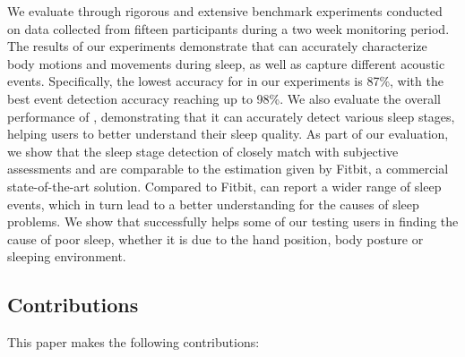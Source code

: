 
We evaluate \systemname through rigorous and extensive benchmark experiments conducted on data collected from fifteen participants during a
two week monitoring period. The results of our experiments demonstrate that \systemname can accurately characterize body motions and
movements during sleep, as well as capture different acoustic events. Specifically, the lowest accuracy for \systemname in our experiments
is 87\%, with the best event detection accuracy reaching up to 98\%. We also evaluate the overall performance of \systemname, demonstrating
that it can accurately detect various sleep stages, helping users to better understand their sleep quality. As part of our evaluation, we
show that the sleep stage detection of \systemname closely match with subjective assessments and are comparable to the estimation given by
Fitbit, a commercial state-of-the-art solution. Compared to Fitbit, \systemname can report a wider range of sleep events, which in turn
lead to a better understanding for the causes of sleep problems. We show that \systemname successfully helps some of our testing users in
finding the cause of poor sleep, whether it is due to the hand position, body posture or sleeping environment.


\subsection{Contributions}
This paper makes the following contributions:

